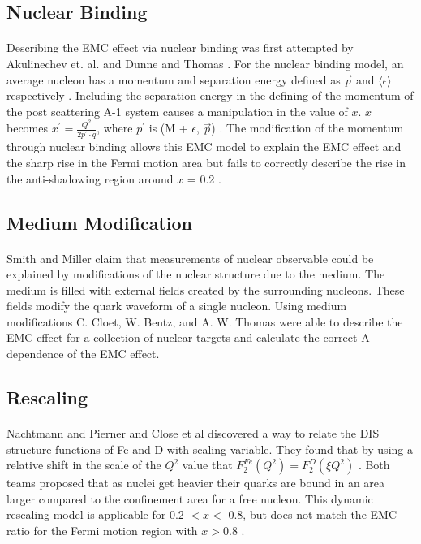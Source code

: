 \subsection{Nuclear Binding}
\paragraph{} Describing the EMC effect via nuclear binding was first attempted by Akulinechev et. al. \cite{EMC_binding_3} and Dunne and Thomas \cite{EMC_binding_2}. For the nuclear binding model, an average nucleon has a momentum and separation energy defined as $\vec{p}$ and $\langle \epsilon \rangle$ respectively \cite{Norton}. Including the separation energy in the defining of the momentum of the post scattering A-1 system causes a manipulation in the value of $x$. $x$ becomes $x^{\prime} = \frac{Q^2}{2p^{\prime}\cdot q}$, where $p^{\prime}$ is (M + $\epsilon$, $\vec{p}$) \cite{Norton}. The modification of the momentum through nuclear binding allows this EMC model to explain the EMC effect and the sharp rise in the Fermi motion area but fails to correctly describe the rise in the anti-shadowing region around $x$ = 0.2 \cite{EMC_binding, EMC_model_1, Ajth}.

\subsection{Medium Modification}
\paragraph{} Smith and Miller \cite{EMC_medium_2} claim that measurements of nuclear observable could be explained by modifications of the nuclear structure due to the medium. The medium is filled with external fields created by the surrounding nucleons. These fields modify the quark waveform of a single nucleon. Using medium modifications C. Cloet, W. Bentz, and A. W. Thomas \cite{EMC_medium_1} were able to describe the EMC effect for a collection of nuclear targets and calculate the correct A dependence of the EMC effect. 


\subsection{Rescaling}
\paragraph{} Nachtmann and Pierner \cite{EMC_rescaling_2} and Close et al \cite{EMC_rescaling_1} discovered a way to relate the DIS structure functions of Fe and D with scaling variable. They found that by using a relative shift in the scale of the $Q^2$ value that $F_2^{Fe}(Q^2) =F_2^{D}(\xi Q^2)$ \cite{Geesaman}. Both teams proposed that as nuclei get heavier their quarks are bound in an area larger compared to the confinement area for a free nucleon. This dynamic rescaling model is applicable for 0.2 $ < x <$ 0.8, but does not match the EMC ratio for the Fermi motion region with $x > 0.8$ \cite{EMC_model_1, EMC_rescaling_1, Geesaman, EMC_rescaling_2}.

